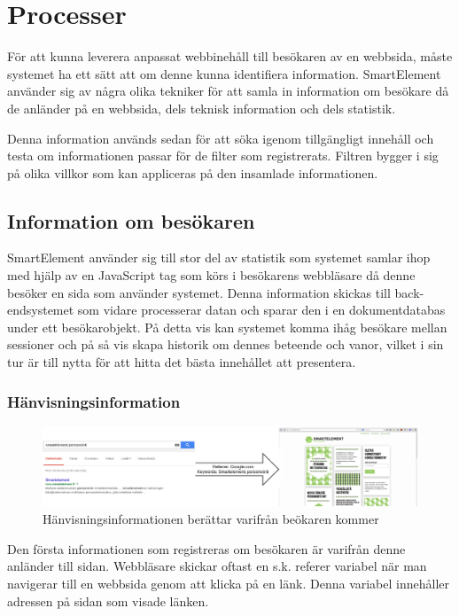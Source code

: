 \section{Processer}

För att kunna leverera anpassat webbinehåll till besökaren av en webbsida, måste systemet ha ett sätt att om denne kunna identifiera information. SmartElement använder sig av några olika tekniker för att samla in information om besökare då de anländer på en webbsida, dels teknisk information och dels statistik.

Denna information används sedan för att söka igenom tillgängligt innehåll och testa om informationen passar för de filter som registrerats. Filtren bygger i sig på olika villkor som kan appliceras på den insamlade informationen.

\subsection{Information om besökaren}

SmartElement använder sig till stor del av statistik som systemet samlar ihop med hjälp av en JavaScript tag som körs i besökarens webbläsare då denne besöker en sida som använder systemet. Denna information skickas till back-endsystemet som vidare processerar datan och sparar den i en dokumentdatabas under ett besökarobjekt. På detta vis kan systemet komma ihåg besökare mellan sessioner och på så vis skapa historik om dennes beteende och vanor, vilket i sin tur är till nytta för att hitta det bästa innehållet att presentera.

\subsubsection{Hänvisningsinformation}

\begin{figure}[h!]
\centering
\includegraphics[width=150mm]{assets/images/smelereferer.png}
\caption{Hänvisningsinformationen berättar varifrån beökaren kommer}
\label{referer}
\end{figure}

Den första informationen som registreras om besökaren är varifrån denne anländer till sidan. Webbläsare skickar oftast en s.k. referer variabel när man navigerar till en webbsida genom att klicka på en länk. Denna variabel innehåller adressen på sidan som visade länken.


